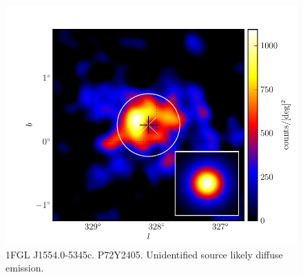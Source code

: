 \documentclass[preprint]{aastex}
\begin{document}
\begin{figure}
  \begin{center}
    \includegraphics[type=pdf,ext=.pdf,read=.pdf]{source_plots/source_1FGL_J1554.0-5345c}
  \end{center}
  \caption{1FGL J1554.0-5345c. P72Y2405. Unidentified source likely diffuse emission.}
  \label{1FGL_J1554.0-5345c}
\end{figure}
\end{document}
